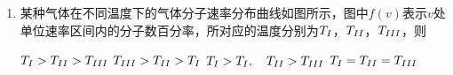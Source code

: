 
\begin{enumerate}[leftmargin=0em]
\renewcommand{\labelenumi}{\arabic{enumi}.}
\item
{}
某种气体在不同温度下的气体分子速率分布曲线如图所示，图中$ f(v) $表示$ v $处单位速率区间内的分子数百分率，所对应的温度分别为$ T_ {\lmd{1}} $，$ T_ {\lmd{2}} $，$ T_ {\lmd{3}} $，则  
\begin{figure}[h!]
\centering

\end{figure}
\fourchoices
{$T _ { \lmd{1}} > T _ { \lmd{2} } > T _ { \lmd{3} }$}
{$T _ { \lmd{3} } > T _ { \lmd{2} } > T _ { \lmd{1} }$	}
{$T _ { \lmd{1} } > T _ { \lmd{1}} , \quad T _ { \lmd{2} } > T _ { \lmd{3} }$}
{$T _ { \lmd{1} } = T _ { \lmd{2} } = T _ { \lmd{3} }$}




\end{enumerate}

